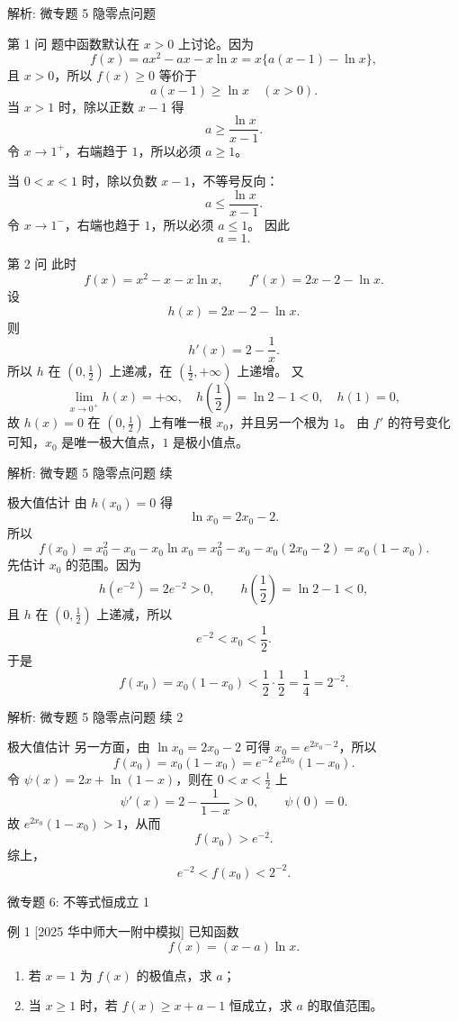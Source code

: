 ﻿\documentclass[aspectratio=169,10pt]{ctexbeamer}
\begin{document}
\begin{frame}[t,allowframebreaks]{解析: 微专题 5 隐零点问题}
\tiny
\begin{block}{第 1 问}
题中函数默认在 $x>0$ 上讨论。因为
\[
f(x)=ax^2-ax-x\ln x=x\{a(x-1)-\ln x\},
\]
且 $x>0$，所以 $f(x)\ge0$ 等价于
\[
a(x-1)\ge\ln x\quad (x>0).
\]
当 $x>1$ 时，除以正数 $x-1$ 得
\[
a\ge \frac{\ln x}{x-1}.
\]
令 $x\to1^+$，右端趋于 $1$，所以必须 $a\ge1$。

当 $0<x<1$ 时，除以负数 $x-1$，不等号反向：
\[
a\le \frac{\ln x}{x-1}.
\]
令 $x\to1^-$，右端也趋于 $1$，所以必须 $a\le1$。
因此
\[
a=1.
\]
\end{block}
\begin{block}{第 2 问}
此时
\[
f(x)=x^2-x-x\ln x,\qquad f'(x)=2x-2-\ln x.
\]
设
\[
h(x)=2x-2-\ln x.
\]
则
\[
h'(x)=2-\frac1x.
\]
所以 $h$ 在 $(0,\frac12)$ 上递减，在 $(\frac12,+\infty)$ 上递增。
又
\[
\lim_{x\to0^+}h(x)=+\infty,\quad h\left(\frac12\right)=\ln2-1<0,\quad h(1)=0,
\]
故 $h(x)=0$ 在 $(0,\frac12)$ 上有唯一根 $x_0$，并且另一个根为 $1$。
由 $f'$ 的符号变化可知，$x_0$ 是唯一极大值点，$1$ 是极小值点。
\end{block}
\end{frame}

\begin{frame}[t,allowframebreaks]{解析: 微专题 5 隐零点问题 续}
\tiny
\begin{block}{极大值估计}
由 $h(x_0)=0$ 得
\[
\ln x_0=2x_0-2.
\]
所以
\[
f(x_0)=x_0^2-x_0-x_0\ln x_0
=x_0^2-x_0-x_0(2x_0-2)
=x_0(1-x_0).
\]
先估计 $x_0$ 的范围。因为
\[
h(e^{-2})=2e^{-2}>0,\qquad h\left(\frac12\right)=\ln2-1<0,
\]
且 $h$ 在 $(0,\frac12)$ 上递减，所以
\[
e^{-2}<x_0<\frac12.
\]
于是
\[
f(x_0)=x_0(1-x_0)<\frac12\cdot\frac12=\frac14=2^{-2}.
\]
\end{block}
\end{frame}

\begin{frame}[t,allowframebreaks]{解析: 微专题 5 隐零点问题 续 2}
\tiny
\begin{block}{极大值估计}
另一方面，由 $\ln x_0=2x_0-2$ 可得 $x_0=e^{2x_0-2}$，所以
\[
f(x_0)=x_0(1-x_0)=e^{-2}\,e^{2x_0}(1-x_0).
\]
令 $\psi(x)=2x+\ln(1-x)$，则在 $0<x<\frac12$ 上
\[
\psi'(x)=2-\frac1{1-x}>0,\qquad \psi(0)=0.
\]
故 $e^{2x_0}(1-x_0)>1$，从而
\[
f(x_0)>e^{-2}.
\]
综上，
\[
e^{-2}<f(x_0)<2^{-2}.
\]
\end{block}
\end{frame}

\begin{frame}[t]{微专题 6: 不等式恒成立 1}
\large
\begin{block}{例 1}
[2025 华中师大一附中模拟] 已知函数
\[
f(x)=(x-a)\ln x.
\]
\begin{enumerate}
  \item 若 $x=1$ 为 $f(x)$ 的极值点，求 $a$；
  \item 当 $x\ge 1$ 时，若 $f(x)\ge x+a-1$ 恒成立，求 $a$ 的取值范围。
\end{enumerate}
\end{block}
\end{frame}
\end{document}
